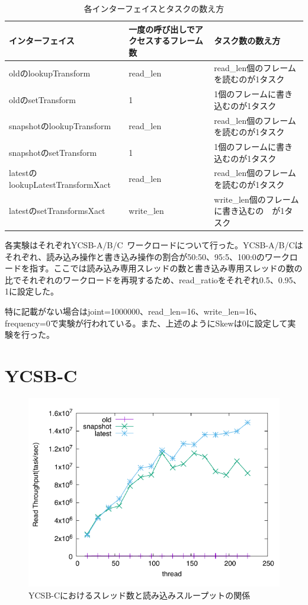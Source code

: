 \documentclass[a4paper]{jreport}	%
\begin{document}
\begin{table}[ht]
\centering
\begin{tabular}[t]{ | m{5cm} | m{5cm} | m{5cm} |}
\hline
インターフェイス & 一度の呼び出しでアクセスするフレーム数 & タスク数の数え方 \\
\hline
oldのlookupTransform & read\_len & read\_len個のフレームを読むのが1タスク \\
oldのsetTransform & 1 & 1個のフレームに書き込むのが1タスク \\
snapshotのlookupTransform& read\_len & read\_len個のフレームを読むのが1タスク \\
snapshotのsetTransform& 1 & 1個のフレームに書き込むのが1タスク \\
latestのlookupLatestTransformXact& read\_len & read\_len個のフレームを読むのが1タスク \\
latestのsetTransformsXact& write\_len & write\_len個のフレームに書き込むの　が1タスク \\
\hline
\end{tabular}
\caption{各インターフェイスとタスクの数え方}
\label{table:task-count-method}
\end{table}%


各実験はそれぞれYCSB-A/B/C~\cite{ycsb}ワークロードについて行った。YCSB-A/B/Cはそれぞれ、読み込み操作と書き込み操作の割合が50:50、95:5、100:0のワークロードを指す。ここでは読み込み専用スレッドの数と書き込み専用スレッドの数の比でそれぞれのワークロードを再現するため、read\_ratioをそれぞれ0.5、0.95、1に設定した。

特に記載がない場合はjoint=1000000、read\_len=16、write\_len=16、frequency=0で実験が行われている。また、上述のようにSkewは0に設定して実験を行った。


\section{YCSB-C}

\begin{figure}[h] 
\centering
\includegraphics[width=15cm]{ycsb-c/opposite-read-throughput}
\caption{YCSB-Cにおけるスレッド数と読み込みスループットの関係}
\label{fig:throughput-c}
\end{figure}
\end{document}
